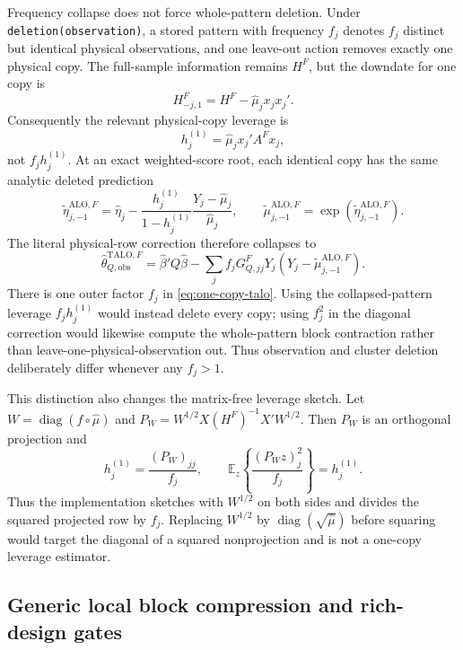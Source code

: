 \documentclass[11pt]{article}
\newcommand{\diag}{\operatorname{diag}}
\newcommand{\TALO}{\mathrm{TALO}}
\newcommand{\ALO}{\mathrm{ALO}}
\newcommand{\E}{\mathbb E}
\begin{document}
Frequency collapse does not force whole-pattern deletion. Under
\texttt{deletion(observation)}, a stored pattern with frequency $f_j$ denotes
$f_j$ distinct but identical physical observations, and one leave-out action
removes exactly one physical copy. The full-sample information remains $H^F$,
but the downdate for one copy is
\[
 H^F_{-j,1}=H^F-\widehat\mu_jx_jx_j'.
\]
Consequently the relevant physical-copy leverage is
\begin{equation}
 h_j^{(1)}=\widehat\mu_jx_j'A^Fx_j,                    \label{eq:one-copy-h}
\end{equation}
not $f_jh_j^{(1)}$. At an exact weighted-score root, each identical copy has
the same analytic deleted prediction
\begin{equation}
 \widetilde\eta_{j,-1}^{\ALO,F}
 =\widehat\eta_j-
 \frac{h_j^{(1)}}{1-h_j^{(1)}}
 \frac{Y_j-\widehat\mu_j}{\widehat\mu_j},
 \qquad
 \widetilde\mu_{j,-1}^{\ALO,F}
 =\exp(\widetilde\eta_{j,-1}^{\ALO,F}).               \label{eq:one-copy-shift}
\end{equation}
The literal physical-row correction therefore collapses to
\begin{equation}
 \widehat\theta_{Q,\mathrm{obs}}^{\TALO,F}
 =\widehat\beta'Q\widehat\beta-
 \sum_j f_jG_{Q,jj}^F Y_j
       (Y_j-\widetilde\mu_{j,-1}^{\ALO,F}).            \label{eq:one-copy-talo}
\end{equation}
There is one outer factor $f_j$ in \eqref{eq:one-copy-talo}. Using the
collapsed-pattern leverage $f_jh_j^{(1)}$ would instead delete every copy;
using $f_j^2$ in the diagonal correction would likewise compute the
whole-pattern block contraction rather than leave-one-physical-observation
out. Thus observation and cluster deletion deliberately differ whenever any
$f_j>1$.

This distinction also changes the matrix-free leverage sketch. Let
$W=\diag(f\circ\widehat\mu)$ and
$P_W=W^{1/2}X(H^F)^{-1}X'W^{1/2}$. Then $P_W$ is an orthogonal projection and
\[
 h_j^{(1)}=\frac{(P_W)_{jj}}{f_j},\qquad
 \E_z\left\{\frac{(P_Wz)_j^2}{f_j}\right\}=h_j^{(1)}.
\]
Thus the implementation sketches with $W^{1/2}$ on both sides and divides
the squared projected row by $f_j$. Replacing $W^{1/2}$ by
$\diag(\sqrt{\widehat\mu})$ before squaring would target the diagonal of a
squared nonprojection and is not a one-copy leverage estimator.

\subsection{Generic local block compression and rich-design gates}
\end{document}
